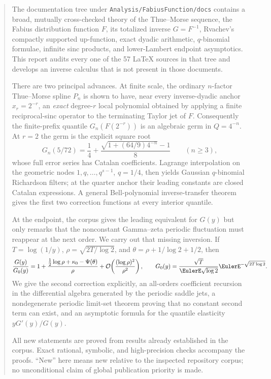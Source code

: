 \documentclass[11pt,oneside]{article}
\numberwithin{equation}{section}
\theoremstyle{definition}
\theoremstyle{remark}
\newcommand{\repo}{\nolinkurl{Analysis/FabiusFunction/docs}}
\begin{document}
\begin{abstract}
The documentation tree under \repo{} contains a broad, mutually cross-checked theory of the
Thue--Morse sequence, the Fabius distribution function $F$, its totalized inverse
$G=F^{-1}$, Rvachev's compactly supported up-function, exact dyadic arithmetic,
$q$-binomial formulae, infinite sinc products, and lower-Lambert endpoint asymptotics.
This report audits every one of the 57 LaTeX sources in that tree and develops an inverse
calculus that is not present in those documents.

There are two principal advances.  At finite scale, the ordinary $n$-factor Thue--Morse
spline $P_n$ is shown to have, near every inverse-dyadic anchor $x_r=2^{-r}$, an
\emph{exact} degree-$r$ local polynomial obtained by applying a finite reciprocal-sinc
operator to the terminating Taylor jet of $F$.  Consequently the finite-prefix quantile
$G_n(F(2^{-r}))$ is an algebraic germ in $Q=4^{-n}$.  At $r=2$ the germ is the explicit
square root
\[
 G_n(5/72)=\frac14+\frac{\sqrt{1+(64/9)4^{-n}}-1}{8}\qquad(n\ge3),
\]
whose full error series has Catalan coefficients.  Lagrange interpolation on the geometric
nodes $1,q,\ldots,q^{s-1}$, $q=1/4$, then yields Gaussian $q$-binomial Richardson filters;
at the quarter anchor their leading constants are closed Catalan expressions.  A general
Bell-polynomial inverse-transfer theorem gives the first two correction functions at every
interior quantile.

At the endpoint, the corpus gives the leading equivalent for $G(y)$ but only remarks that
the nonconstant Gamma--zeta periodic fluctuation must reappear at the next order.  We carry
out that missing inversion.  If $T=\log(1/y)$,
$\rho=\sqrt{2T/\log2}$, and $\theta=\rho+1/\log2+1/2$, then
\[
 \frac{G(y)}{G_0(y)}
 =1+\frac{\tfrac12\log\rho+\kappa_0-\Psi(\theta)}{\rho}
 +\BigO\!\left(\frac{(\log\rho)^2}{\rho^2}\right),
 \qquad
 G_0(y)=\frac{\sqrt T}{\EulerE\sqrt{\log2}}\EulerE^{-\sqrt{2T\log2}}.
\]
We give the second correction explicitly, an all-orders coefficient recursion in the
differential algebra generated by the periodic saddle jets, a nondegenerate periodic limit-set
theorem proving that no constant second term can exist, and an asymptotic formula for the
quantile elasticity $yG'(y)/G(y)$.

All new statements are proved from results already established in the corpus.  Exact rational,
symbolic, and high-precision checks accompany the proofs.  ``New'' here means new relative
to the inspected repository corpus; no unconditional claim of global publication priority is
made.
\end{abstract}
\end{document}
